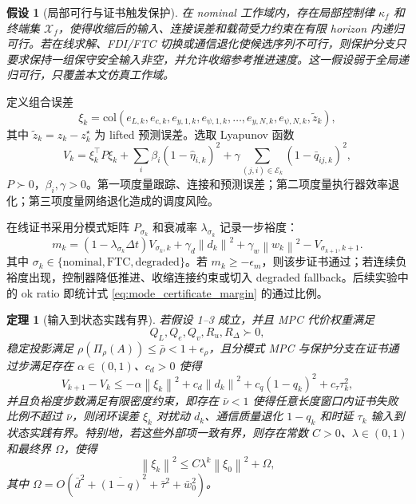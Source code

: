 \documentclass[twocolumn,3p,times,procedia]{elsarticle}
\newcommand{\norm}[1]{\left\lVert #1 \right\rVert}
\newtheorem{assumption}{假设}
\newtheorem{theorem}{定理}
\begin{document}
\begin{assumption}[局部可行与证书触发保护]
在 nominal 工作域内，存在局部控制律 $\kappa_f$ 和终端集 $\mathcal X_f$，使得收缩后的输入、连接误差和载荷受力约束在有限 horizon 内递归可行。若在线求解、FDI/FTC 切换或通信退化使候选序列不可行，则保护分支只要求保持一组保守安全输入非空，并允许收缩参考推进速度。这一假设弱于全局递归可行，只覆盖本文仿真工作域。
\end{assumption}

定义组合误差
\begin{equation}
\xi_k=\mathrm{col}\left(e_{L,k},e_{c,k},e_{y,1,k},e_{\psi,1,k},\ldots,e_{y,N,k},e_{\psi,N,k},\tilde z_k\right),
\label{eq:xi_def}
\end{equation}
其中 $\tilde z_k=z_k-z_k^\star$ 为 lifted 预测误差。选取 Lyapunov 函数
\begin{equation}
V_k=\xi_k^\top P\xi_k+\sum_i \beta_i(1-\hat\eta_{i,k})^2+\gamma\sum_{(j,i)\in\mathcal E_k}(1-\bar q_{ij,k})^2 ,
\label{eq:lyapunov}
\end{equation}
$P\succ0$，$\beta_i,\gamma>0$。第一项度量跟踪、连接和预测误差；第二项度量执行器效率退化；第三项度量网络退化造成的调度风险。

在线证书采用分模式矩阵 $P_{\sigma_k}$ 和衰减率 $\lambda_{\sigma_k}$ 记录一步裕度：
\begin{equation}
m_k=(1-\lambda_{\sigma_k}\Delta t)V_{\sigma_k,k}
+\gamma_d\norm{d_k}^2+\gamma_w\norm{w_k}^2
-V_{\sigma_{k+1},k+1}.
\label{eq:mode_certificate_margin}
\end{equation}
其中 $\sigma_k\in\{\mathrm{nominal},\mathrm{FTC},\mathrm{degraded}\}$。若 $m_k\ge -\epsilon_m$，则该步证书通过；若连续负裕度出现，控制器降低推进、收缩连接约束或切入 degraded fallback。后续实验中的 ok ratio 即统计式 \eqref{eq:mode_certificate_margin} 的通过比例。

\begin{theorem}[输入到状态实践有界]
若假设 1--3 成立，并且 MPC 代价权重满足
\begin{equation}
Q_L,Q_e,Q_v,R_u,R_\Delta\succ0,
\label{eq:positive_weights}
\end{equation}
稳定投影满足 $\rho(\Pi_\rho(A))\le \bar\rho<1+\epsilon_\rho$，且分模式 MPC 与保护分支在证书通过步满足存在 $\alpha\in(0,1)$、$c_d>0$ 使得
\begin{equation}
V_{k+1}-V_k\le -\alpha\norm{\xi_k}^2+c_d\norm{d_k}^2+c_q(1-q_k)^2+c_\tau\tau_k^2,
\label{eq:iss_difference}
\end{equation}
并且负裕度步数满足有限密度约束，即存在 $\bar \nu<1$ 使得任意长度窗口内证书失败比例不超过 $\bar \nu$，则闭环误差 $\xi_k$ 对扰动 $d_k$、通信质量退化 $1-q_k$ 和时延 $\tau_k$ 输入到状态实践有界。特别地，若这些外部项一致有界，则存在常数 $C>0$、$\lambda\in(0,1)$ 和最终界 $\Omega$，使得
\begin{equation}
\norm{\xi_k}^2\le C\lambda^k\norm{\xi_0}^2+\Omega ,
\label{eq:uub_bound}
\end{equation}
其中 $\Omega=O(\bar d^2+\overline{(1-q)}^2+\bar\tau^2+\bar w_0^2)$。
\end{theorem}
\end{document}
